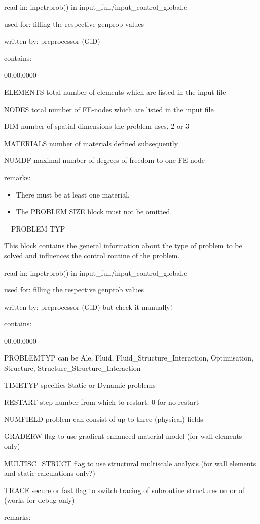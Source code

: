 read in: inpctrprob() in input\_full/input\_control\_global.c

used for: filling the respective genprob values 

written by: preprocessor (GiD) 

contains: 

\begin{lyxlist}{00.00.0000}
\item [{ELEMENTS}] total number of elements which are listed in the input
file 
\item [{NODES}] total number of FE-nodes which are listed in the input
file 
\item [{DIM}] number of spatial dimensions the problem uses, 2 or 3 
\item [{MATERIALS}] number of materials defined subsequently 
\item [{NUMDF}] maximal number of degrees of freedom to one FE node 
\end{lyxlist}
remarks: 

\begin{itemize}
\item There must be at least one material. 
\item The PROBLEM SIZE block must not be omitted.
\end{itemize}
---PROBLEM TYP 

This block contains the general information about the type of problem
to be solved and influences the control routine of the problem. 

read in: inpctrprob() in input\_full/input\_control\_global.c

used for: filling the respective genprob values 

written by: preprocessor (GiD) but check it manually! 

contains: 

\begin{lyxlist}{00.00.0000}
\item [{PROBLEMTYP}] can be Ale, Fluid, Fluid\_Structure\_Interaction,
Optimisation, Structure, Structure\_Structure\_Interaction 
\item [{TIMETYP}] specifies Static or Dynamic problems 
\item [{RESTART}] step number from which to restart; 0 for no restart 
\item [{NUMFIELD}] problem can consist of up to three (physical) fields 
\item [{GRADERW}] flag to use gradient enhanced material model (for wall
elements only) 
\item [{MULTISC\_STRUCT}] flag to use structural multiscale analysis (for
wall elements and static calculations only?) 
\item [{TRACE}] secure or fast flag to switch tracing of subroutine structures
on or of (works for debug only) 
\end{lyxlist}
remarks: 

